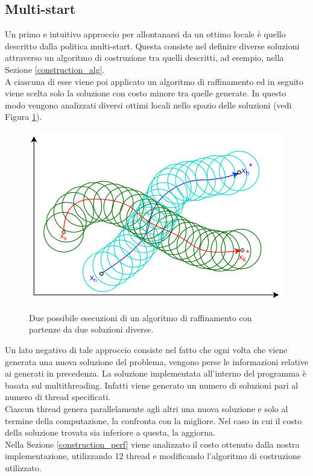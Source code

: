 \subsection{Multi-start}
Un primo e intuitivo approccio per allontanarsi da un ottimo locale è quello descritto dalla politica multi-start. Questa consiste nel definire diverse soluzioni attraverso un algoritmo di costruzione tra quelli descritti, ad esempio, nella Sezione \ref{construction_alg}.\\
A ciascuna di esse viene poi applicato un algoritmo di raffinamento ed in seguito  viene scelta solo la soluzione con costo minore tra quelle generate. In questo modo vengono analizzati diversi ottimi locali nello spazio delle soluzioni (vedi Figura \ref{multi_start}). 
\begin{figure}[H] 
\begin{center} 
  \includegraphics[scale=0.4]{Images/multistart}\\ 
  \caption{\footnotesize{Due possibile esecuzioni di un algoritmo di raffinamento con partenze da due soluzioni diverse.}}
  \label{multi_start}
\end{center}
\end{figure}
Un lato negativo di tale approccio consiste nel fatto che ogni volta che viene generata una nuova soluzione del problema, vengono perse le informazioni relative ai generati in precedenza. La soluzione implementata all'interno del programma è basata sul multithreading. Infatti viene generato un numero di soluzioni pari al numero di thread specificati.\\
Ciascun thread genera parallelamente agli altri una nuova soluzione e solo al termine della computazione, la confronta con la migliore. Nel caso in cui il costo della soluzione trovata sia inferiore a questa, la aggiorna. \\
Nella Sezione \ref{construction_perf} viene analizzato il costo ottenuto dalla nostra implementazione, utilizzando 12 thread e modificando l'algoritmo di costruzione utilizzato.\\

